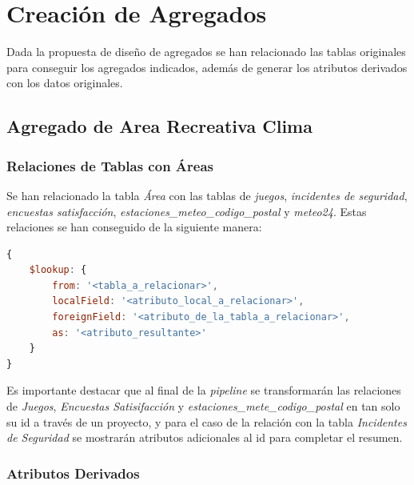\documentclass[]{article}
\begin{document}
\newpage
\section{Creación de Agregados}
\label{sec:creacion_agregados}
Dada la propuesta de diseño de agregados se han relacionado las tablas originales para conseguir los agregados indicados, además de generar los atributos derivados con los datos originales.

\subsection{Agregado de Area Recreativa Clima}
\label{subsec:agregado_area}

\subsubsection{Relaciones de Tablas con Áreas}
\label{subsubsec:relaciones_area}

Se han relacionado la tabla \textit{Área} con las tablas de \textit{juegos}, \textit{incidentes de seguridad}, \textit{encuestas satisfacción}, \textit{estaciones\_meteo\_codigo\_postal} y \textit{meteo24}.
Estas relaciones se han conseguido de la siguiente manera:
\begin{lstlisting}[language=JavaScript, caption=Operadores para relacionar tablas en mongodb]
{
    $lookup: {
        from: '<tabla_a_relacionar>',
        localField: '<atributo_local_a_relacionar>',
        foreignField: '<atributo_de_la_tabla_a_relacionar>',
        as: '<atributo_resultante>'
    }
}
\end{lstlisting}

Es importante destacar que al final de la \textit{pipeline} se transformarán las relaciones de \textit{Juegos}, \textit{Encuestas Satisifacción} y \textit{estaciones\_mete\_codigo\_postal} en tan solo su id a través de un proyecto, y para el caso de la relación con la tabla \textit{Incidentes de Seguridad} se mostrarán atributos adicionales al id para completar el resumen.
\subsubsection{Atributos Derivados}
\label{subsubsec:derivados_area}
\end{document}
